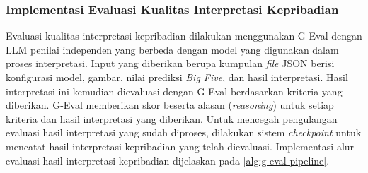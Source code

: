 \subsubsection{Implementasi Evaluasi Kualitas Interpretasi Kepribadian}

Evaluasi kualitas interpretasi kepribadian dilakukan menggunakan G-Eval dengan LLM penilai independen yang berbeda dengan model yang digunakan dalam proses interpretasi. Input yang diberikan berupa kumpulan \textit{file} JSON berisi konfigurasi model, gambar, nilai prediksi \textit{Big Five}, dan hasil interpretasi. Hasil interpretasi ini kemudian dievaluasi dengan G-Eval berdasarkan kriteria yang diberikan. G-Eval memberikan skor beserta alasan (\textit{reasoning}) untuk setiap kriteria dan hasil interpretasi yang diberikan. Untuk mencegah pengulangan evaluasi hasil interpretasi yang sudah diproses, dilakukan sistem \textit{checkpoint} untuk mencatat hasil interpretasi kepribadian yang telah dievaluasi. Implementasi alur evaluasi hasil interpretasi kepribadian dijelaskan pada \autoref{alg:g-eval-pipeline}.  

